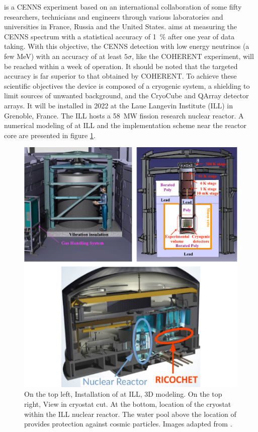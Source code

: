 \Ricochet{} is a CENNS experiment based on an international collaboration of
some fifty researchers, technicians and engineers through various laboratories and universities in France, Russia and the United States. \Ricochet{} aims at measuring the CENNS spectrum with a statistical accuracy of \SI{1}{\percent} after one year of data taking. With this objective, the CENNS detection with low energy neutrinos (a few \si{\mega\eV}) with an accuracy of at least $5\sigma$, like the COHERENT experiment, will be reached within a week of operation. 
It should be noted that the targeted accuracy is far superior to that obtained by COHERENT. To achieve these scientific objectives the \Ricochet{} device is composed of a cryogenic system, a shielding to limit sources of unwanted background, and the CryoCube and QArray detector arrays. It will be installed in 2022 at the Laue Langevin Institute (ILL) in Grenoble, France. The ILL hosts a \SI{58}{\mega\watt} fission research nuclear reactor. A numerical modeling of \Ricochet{} at ILL and the implementation scheme near the reactor core are presented in figure \ref{fig:ricochet-ill-site}.

\begin{figure}
\centering
\includegraphics[scale=1]{Figures/Introduction/ricochet_ill_site.pdf}
\caption{On the top left, Installation of \Ricochet{} at ILL, 3D modeling. On the top right, View in
cryostat cut. At the bottom, location of the \Ricochet{} cryostat within the ILL nuclear reactor. The water pool above the location of \Ricochet{} provides protection against cosmic particles. Images adapted from \cite{HDRJulien}.}
\label{fig:ricochet-ill-site}
\end{figure}

